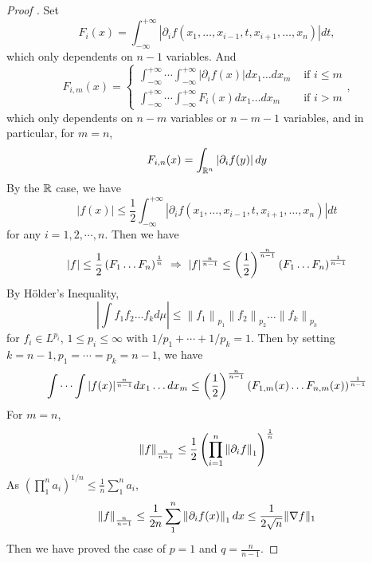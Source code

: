 \begin{proof}[Proof ]
	Set
	\begin{equation*}
		F_i(x)=\int_{-\infty}^{+\infty}\left|\partial_i f\left(x_1, \ldots, x_{i-1}, t, x_{i+1}, \ldots, x_n\right)\right| d t,
	\end{equation*}
	which only dependents on $n-1$ variables. And
	\begin{equation*}
		F_{i, m}(x)=
			\left\{\begin{array}{cl}
				\int_{-\infty}^{+\infty} \cdots \int_{-\infty}^{+\infty}\left|\partial_i f(x)\right| d x_1 \ldots d x_m & \text { if } i \leq m \\
				\int_{-\infty}^{+\infty} \cdots \int_{-\infty}^{+\infty} F_i(x) d x_1 \ldots d x_m & \text { if } i>m
			\end{array}\right.,
	\end{equation*}
	which only dependents on $n-m$ variables or $n-m-1$ variables, and in particular, for $m=n$,
	\begin{equation*}
		F_{i,n}(x) = \int_{\mathbb{R}^n} \left\lvert\partial_if(y)\right\lvert dy
	\end{equation*}
	By the $\mathbb{R}$ case, we have
	\begin{equation*}
		|f(x)| \leq \frac{1}{2} \int_{-\infty}^{+\infty}\left|\partial_i f\left(x_1, \ldots, x_{i-1}, t, x_{i+1}, \ldots, x_n\right)\right| d t
	\end{equation*}
	for any $i = 1,2,\cdots,n$. Then we have
	\begin{equation*}
		|f| \leq \frac{1}{2}\left(F_1 \ldots F_n\right)^{\frac{1}{n}} ~\Rightarrow~ |f|^{\frac{n}{n-1}} \leq \left(\frac{1}{2}\right)^{\frac{n}{n-1}}\left(F_1 \ldots F_n\right)^{\frac{1}{n-1}}
	\end{equation*}
	By H\"older's Inequality, 
	\begin{equation*}
		\left|\int f_1 f_2 \ldots f_k d \mu\right| \leq\left\|f_1\right\|_{p_1}\left\|f_2\right\|_{p_2} \ldots\left\|f_k\right\|_{p_k}
	\end{equation*}
	for $f_i \in L^{p_i}$, $1 \leq p_i \leq \infty$ with $1/p_1 + \cdots +1 / p_k =1$. Then by setting $k = n-1, p_1= \cdots = p_k = n-1$, we have
	\begin{equation*}
		\int \cdots \int|f(x)|^{\frac{n}{n-1}} d x_1 \ldots d x_m \leq\left(\frac{1}{2}\right)^{\frac{n}{n-1}}\left(F_{1, m}(x) \ldots F_{n, m}(x)\right)^{\frac{1}{n-1}}
	\end{equation*}
	For $m = n$,
	\begin{equation*}
		\left\lVert f\right\lVert_{\frac{n}{n-1}} \leq \frac{1}{2}\left(\prod_{i=1}^n \left\lVert\partial_if\right\lVert_1\right)^{\frac{1}{n}}
	\end{equation*}
	As $\left(\prod_1^n a_i\right)^{1 / n} \leq \frac{1}{n} \sum_1^n a_i$,
	\begin{equation*}
		\left\lVert f\right\lVert_{\frac{n}{n-1}} \leq \frac{1}{2 n} \sum_1^n\left\|\partial_i f(x)\right\|_1 d x \leq \frac{1}{2 \sqrt{n}}\|\nabla f\|_1
	\end{equation*}
	Then we have proved the case of $p=1$ and $q = \frac{n}{n-1}$.


\end{proof}
